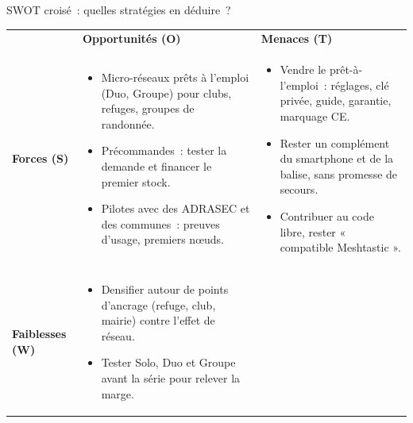\newenvironment{pucesx}
  {\begingroup\setbeamerfont{itemize/enumerate body}{size=\scriptsize}\begin{itemize}\setlength{\itemsep}{0pt}\setlength{\topsep}{1pt}}
  {\end{itemize}\endgroup}
\begin{frame}{SWOT croisé~: quelles stratégies en déduire~?}
  \footnotesize\renewcommand{\arraystretch}{1.0}\setlength{\tabcolsep}{4pt}
   
  \noindent\begin{tabularx}{\textwidth}{@{}>{\raggedright\arraybackslash}p{1.65cm}>{\raggedright\arraybackslash}X>{\raggedright\arraybackslash}X@{}}
    & \cellcolor{insarose}\textcolor{insarouge}{\bfseries Opportunités (O)} & \cellcolor{insarose}\textcolor{insarouge}{\bfseries Menaces (T)} \\[2pt]
    \cellcolor{insarose}\textcolor{insarouge}{\bfseries Forces (S)} &
      \cellcolor{insabeige}{\sffamily\bfseries\color{insarouge}Attaquer}
      \begin{pucesx}
        \item Micro-réseaux prêts à l'emploi (Duo, Groupe) pour clubs, refuges, groupes de randonnée.
        \item Précommandes~: tester la demande et financer le premier stock.
        \item Pilotes avec des ADRASEC et des communes~: preuves d'usage, premiers nœuds.
      \end{pucesx} &
      \cellcolor{insabeige}{\sffamily\bfseries\color{insarouge}Défendre}
      \begin{pucesx}
        \item Vendre le prêt-à-l'emploi~: réglages, clé privée, guide, garantie, marquage CE.
        \item Rester un complément du smartphone et de la balise, sans promesse de secours.
        \item Contribuer au code libre, rester « compatible Meshtastic ».
      \end{pucesx} \\[3pt]
    \cellcolor{insarose}\textcolor{insarouge}{\bfseries Faiblesses (W)} &
      \cellcolor{insabeige}{\sffamily\bfseries\color{insarouge}Corriger}
      \begin{pucesx}
        \item Densifier autour de points d'ancrage (refuge, club, mairie) contre l'effet de réseau.
        \item Tester Solo, Duo et Groupe avant la série pour relever la marge.

\end{pucesx}
\end{tabularx}
\end{frame}
